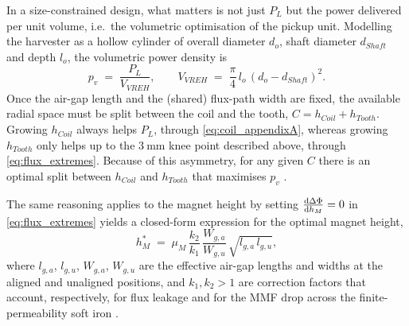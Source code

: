 In a size-constrained design, what matters is not just $P_L$ but the power delivered per unit volume, i.e.\ the volumetric optimisation of the pickup unit. Modelling the harvester as a hollow cylinder of overall diameter $d_o$, shaft diameter $d_{Shaft}$ and depth $l_o$, the volumetric power density is
\begin{equation}
    p_v \;=\; \frac{P_L}{V_{VREH}}, \qquad V_{VREH} \;=\; \frac{\pi}{4}\,l_o\,(d_o-d_{Shaft})^2.
    \label{eq:power_density}
\end{equation}
Once the air-gap length and the (shared) flux-path width are fixed, the available radial space must be split between the coil and the tooth, $C = h_{Coil}+h_{Tooth}$. Growing $h_{Coil}$ always helps $P_L$, through \eqref{eq:coil_appendixA}, whereas growing $h_{Tooth}$ only helps up to the $3\ \text{mm}$ knee point described above, through \eqref{eq:flux_extremes}. Because of this asymmetry, for any given $C$ there is an optimal split between $h_{Coil}$ and $h_{Tooth}$ that maximises $p_v$ \cite{xuDesignModelingOptimization2019a}.

The same reasoning applies to the magnet height by setting $\dv{\Delta\Phi}{h_M}=0$ in \eqref{eq:flux_extremes} yields a closed-form expression for the optimal magnet height,
\begin{equation}
    h_M^{\ast} \;=\; \mu_M\,\frac{k_2}{k_1}\,\frac{W_{g,a}}{W_{g,u}}\,\sqrt{l_{g,a}\,l_{g,u}},
    \label{eq:optimal_hm}
\end{equation}
where $l_{g,a}$, $l_{g,u}$, $W_{g,a}$, $W_{g,u}$ are the effective air-gap lengths and widths at the aligned and unaligned positions, and $k_1,k_2>1$ are correction factors that account, respectively, for flux leakage and for the MMF drop across the finite-permeability soft iron \cite{xuDesignModelingOptimization2019a}.




